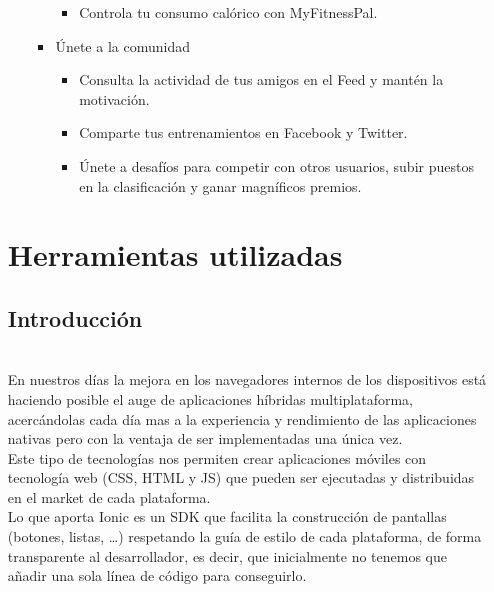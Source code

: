 \documentclass[a4paper, 11pt]{article}
\begin{document}
\begin{itemize}
\begin{itemize}
\begin{itemize}
\begin{itemize}
                                \item {Controla tu consumo calórico con MyFitnessPal.}
                              \end{itemize}
                              \item {Únete a la comunidad}
                              \begin{itemize}
                                \item {Consulta la actividad de tus amigos en el Feed y mantén la motivación.}
                                \item {Comparte tus entrenamientos en Facebook y Twitter.}
                                \item {Únete a desafíos para competir con otros usuarios, subir puestos en la clasificación y ganar magníficos premios.}
                              \end{itemize}
                            \end{itemize}
              \end{itemize}

    \section{Herramientas utilizadas}

        \subsection{Introducción}\\

              En nuestros días la mejora en los navegadores internos de los dispositivos está haciendo
              posible el auge de aplicaciones híbridas multiplataforma, acercándolas cada día mas a
              la experiencia y rendimiento de las aplicaciones nativas pero con la ventaja de ser
              implementadas una única vez.\\


              Este tipo de tecnologías nos permiten crear aplicaciones móviles con tecnología web
              (CSS, HTML y JS) que pueden ser ejecutadas y distribuidas en el market de cada plataforma.\\

              Lo que aporta Ionic es un SDK que facilita la construcción de pantallas (botones, listas, …)
              respetando la guía de estilo de cada plataforma, de forma transparente al desarrollador,
              es decir, que inicialmente no tenemos que añadir una sola línea de código para conseguirlo.\\


\end{itemize}
\end{document}
